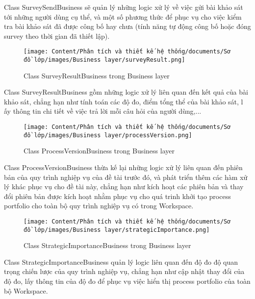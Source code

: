 \par
Class SurveySendBusiness sẽ quản lý những logic xử lý về việc gửi bài khảo sát tới những người dùng cụ thể, và một số phương thức để phục 
vụ cho việc kiểm tra bài khảo sát đã được công bố hay chưa (tính năng tự động công bố hoặc đóng survey theo thời gian đã thiết lập).
\begin{figure}[H]
    \centering
    \texttt{[image: Content/Phân tích và thiết kế hệ thống/documents/Sơ đồ lớp/images/Business layer/surveyResult.png]}
    \vspace{0.5cm}
    \caption{Class SurveyResultBusiness trong Business layer}
    \label{fig:Class SurveyResultBusiness trong Business layer}
\end{figure}
\par
Class SurveyResultBusiness gồm những logic xử lý liên quan đến kết quả của bài khảo sát, chẳng hạn như tính toán các độ đo, điểm tổng thể của bài khảo sát, l
ấy thông tin chi tiết về việc trả lời mỗi câu hỏi của người dùng,...
\begin{figure}[H]
    \centering
    \texttt{[image: Content/Phân tích và thiết kế hệ thống/documents/Sơ đồ lớp/images/Business layer/processVersion.png]}
    \vspace{0.5cm}
    \caption{Class ProcessVersionBusiness trong Business layer}
    \label{fig:Class ProcessVersionBusiness trong Business layer}
\end{figure}
\par
Class ProcessVersionBusiness thừa kế lại những logic xử lý liên quan đến phiên bản của quy trình nghiệp vụ của đề tài trước đó, và 
phát triển thêm các hàm xử lý khác phục vụ cho đề tài này, chẳng hạn như kích hoạt các phiên bản và thay đổi phiên bản được kích hoạt nhằm 
phục vụ cho quá trinh khởi tạo process portfolio cho toàn bộ quy trình nghiệp vụ có trong Workspace.
\begin{figure}[H]
    \centering
    \texttt{[image: Content/Phân tích và thiết kế hệ thống/documents/Sơ đồ lớp/images/Business layer/strategicImportance.png]}
    \vspace{0.5cm}
    \caption{Class StrategicImportanceBusiness trong Business layer}
    \label{fig:Class StrategicImportanceBusiness trong Business layer}
\end{figure}
\par
Class StrategicImportanceBusiness quản lý logic liên quan đến độ đo độ quan trọng chiến lược của quy trình nghiệp vụ, 
chẳng hạn như cập nhật thay đổi của độ đo, lấy thông tin của độ đo để phục vụ việc hiển thị process portfolio của toàn bộ Workspace.
